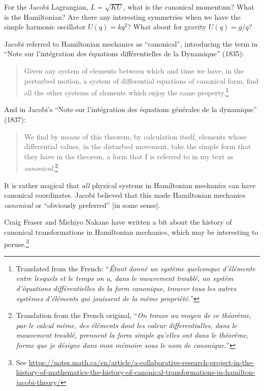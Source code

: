 \begin{exercise}
For the Jacobi Lagrangian, $L =\sqrt{KU}$, what is the canonical
momentum? What is the Hamiltonian? Are there any interesting symmetries
when we have the simple harmonic oscillator $U(q)=kq^{2}$? What about
for gravity $U(q)=g/q$?
\end{exercise}

Jacobi referred to Hamiltonian mechanics as ``canonical'', introducing
the term in ``Note sur l'int\'egration des \'equations diff\'erentielles de la Dynamique''
(1835):
\begin{quote}
Given any system of elements between which and
time we have, in the perturbed motion, a system of differential equations
of canonical form, find all the other
systems of elements which enjoy the same property.\footnote{Translated
from the French: ``\textit{\'Etant donn\'e un syst\`eme quelconque d'\'el\'emente entre lesquels et
le temps on a, dans le mouvement troubl\'e, un syst\`em d'\'equations
diff\'erentielles de la form canonique, trouver tous les autres
syst\`emes d'\'el\'ements qui jouissent de la m\^eme propri\'et\'e.}''}
\end{quote}
And in Jacobi's ``Note sur l’int\'egration des \'equations g\'en\'erales de la dynamique'' (1837):

\begin{quote}
  We find by means of this theorem, by calculation itself,
elements whose differential values, in the disturbed movement,
take the simple form that they have in the theorem, a form that I
is referred to in my text as \emph{canonical}.\footnote{Translation from
the French original, ``\textit{On trouve au moyen de ce th\'eor\`eme, par le
calcul m\^eme, des \'el\'ements dont les valeur differentialles, dans le
mouvement troubl\'e, prennent la form simple qu'elles ont dans le
th\'eor\`eme, forme que je d\'esigne dans mon m\'emoire sous le nom de
\emph{canonique}.}''}
\end{quote}

It is rather magical that \emph{all} physical systems in Hamiltonian
mechanics can have canonical coordinates. Jacobi believed that this made
Hamiltonian mechanics \emph{canonical} or ``obviously preferred'' [in
some sense].

Craig Fraser and Michiyo Nakane have written a bit about the history of
canonical transformations in Hamiltonian mechanics, which may be
interesting to peruse.\footnote{See
\url{https://notes.math.ca/en/article/a-collaborative-research-project-in-the-history-of-mathematics-the-history-of-canonical-transformations-in-hamilton-jacobi-theory/}}

